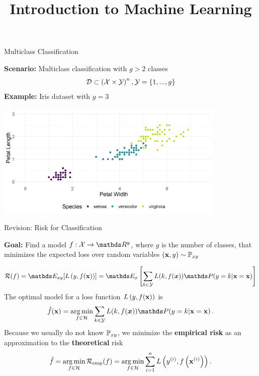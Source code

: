 \documentclass[11pt,compress,t,notes=noshow, xcolor=table]{beamer}
\title{Introduction to Machine Learning}
\begin{document}
    

\begin{vbframe}{Multiclass Classification}

\textbf{Scenario:} Multiclass classification with $g > 2$ classes
$$\mathcal{D} \subset \left(\mathcal{X} \times \mathcal{Y}\right)^n, \mathcal{Y} = \{1, ..., g\}$$ 
\textbf{Example:} Iris dataset with $g = 3$

\vspace*{0.1cm}
\begin{center}
\includegraphics[width = 11cm ]{figure/iris_scatter.png}
\end{center}

\end{vbframe}

\begin{vbframe}{Revision: Risk for Classification}

\textbf{Goal:} Find a model  $f: \Xspace \to \R^g$, where $g$ is the number of classes, that minimizes the expected loss over random variables $(\mathbf{x}, y) \sim \mathbb{P}_{xy}$ 

$$
 \riskf = \E_{xy}[\Lxy] = \E_{x}\left[\sum_{k \in \Yspace} L(k, f(\bm{x})) \P(y = k| \xv = \xv)\right] 
$$
The optimal model for a loss function $L\left(y, f(\mathbf{x})\right)$ is
$$
  \fxh = \argmin_{f \in \Hspace} \sum_{k \in \Yspace} L(k, f(\bm{x})) \P(y = k| \xv = \xv)\,. $$
Because we usually do not know $\mathbb{P}_{xy}$, we minimize the \textbf{empirical risk} as an approximation to the \textbf{theoretical} risk
$$
\hat{f} = \operatorname*{arg\,min}_{f \in \mathcal{H}} \mathcal{R}_{\text{emp}}(f) = \operatorname*{arg\,min}_{f \in \mathcal{H}} \sum\limits_{i=1}^n L\left(y^{(i)}, f\left(\mathbf{x}^{(i)}\right)\right).
$$
\end{vbframe}
\end{document}
